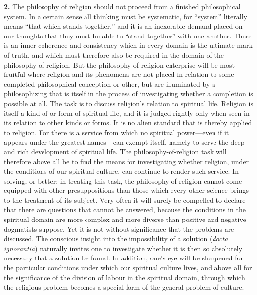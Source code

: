 \documentclass[12pt,a4paper]{book}
\newcommand{\opage}[1]{\marginnote{\footnotesize\textit{[#1]}}}
\begin{document}
\noindent\textbf{2.} The philosophy of religion should not proceed from
a finished philosophical system. In a certain sense all thinking must be
systematic, for ``system'' literally means ``that which stands
together,'' and it is an inexorable demand placed on our thoughts that
they must be able to ``stand together'' with one another. There is an
inner coherence and consistency which in every domain is the ultimate
mark of truth, and which must therefore also be required in the domain
of the philosophy of religion. But the philosophy-of-religion enterprise
will be most fruitful where religion and its phenomena are not placed in
relation to some completed philosophical conception or other, but are
illuminated by a philosophizing that is itself in the process of
investigating whether a completion is possible at all. The task is to
discuss religion's relation to spiritual life. Religion is itself a kind
of or form of spiritual life, and it is judged rightly only when seen in
its relation to other kinds or forms. It is no alien standard that is
thereby applied to religion. For there is a service from which no
spiritual power---even if it appears under the greatest names---can
exempt itself, namely to serve the deep and rich development of
spiritual life. The philosophy-of-religion task will therefore above all
be to find the means for investigating whether religion, under the
conditions of our spiritual culture, can continue to render such
service. In solving, or better: in treating this task, the philosophy of
religion cannot come equipped with other presuppositions than those
which every other science brings to the treatment of its subject. Very
often it will surely be compelled to declare that there are questions
that cannot be answered, because the conditions in the spiritual domain
are more complex and more diverse than positive and negative dogmatists
suppose. Yet it is not without significance that the problems are
discussed. The conscious 
\opage{6}insight into the impossibility of a solution
(\textit{docta ignorantia}) naturally invites one to investigate whether
it is then so absolutely necessary that a solution be found. In
addition, one's eye will be sharpened for the particular conditions
under which our spiritual culture lives, and above all for the
significance of the division of labour in the spiritual domain, through
which the religious problem becomes a special form of the general
problem of culture.
\end{document}
